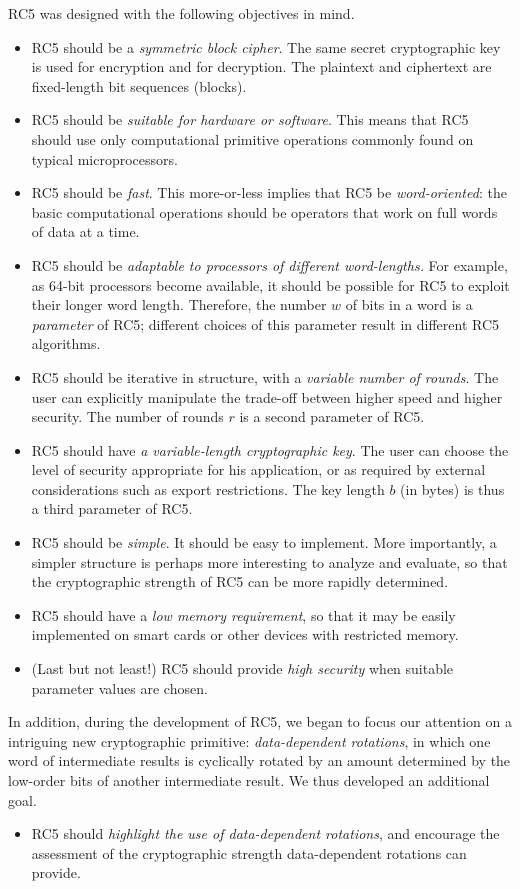 RC5 was designed with the following objectives in mind.
\begin{itemize}
\item RC5 should be a {\em symmetric block cipher}.  The same secret
cryptographic key is used for encryption and for decryption.  The plaintext
and ciphertext are fixed-length bit sequences (blocks).
\item RC5 should be {\em suitable for hardware or software}.  This means that
RC5 should use only computational primitive operations commonly found on
typical microprocessors.
\item RC5 should be {\em fast}.  This more-or-less implies that RC5 be
{\em word-oriented}: the basic computational operations should be operators
that work on full words of data at a time.
\item RC5 should be {\em adaptable to processors of different word-lengths.}
For example, as 64-bit processors become available, it should be possible
for RC5 to exploit their longer word length.  Therefore, the number $w$ 
of bits in a word is a {\em parameter} of RC5; different choices of
this parameter result in different RC5 algorithms.
\item RC5 should be iterative in structure, with a {\em variable number of
rounds}.  The user can explicitly manipulate the trade-off between
higher speed and higher security.  The number of rounds $r$ is a second
parameter of RC5.
\item RC5 should have {\em a variable-length cryptographic key}.  The user
can choose the level of security appropriate for his application, or as
required by external considerations such as export restrictions.  The
key length $b$ (in bytes) is thus a third parameter of RC5.
\item RC5 should be {\em simple}.  It should be easy to implement.  More
importantly, a simpler structure is perhaps more interesting to analyze and
evaluate, so that the cryptographic strength of RC5 can be more rapidly
determined.
\item RC5 should have a {\em low memory requirement}, so that it may 
be easily implemented on smart cards or other devices with restricted memory.
\item (Last but not least!) RC5 should provide {\em high security} 
when suitable parameter values are chosen.
\end{itemize}

In addition, during the development of RC5, we began to focus our
attention on a intriguing new cryptographic primitive: 
{\em data-dependent rotations}, in which one word of intermediate results
is cyclically rotated by an amount determined by the low-order bits of
another intermediate result.  We thus developed an additional goal.
\begin{itemize} \item RC5 should {\em highlight the use of
data-dependent rotations}, and encourage the assessment of the
cryptographic strength data-dependent rotations can provide.
\end{itemize}

